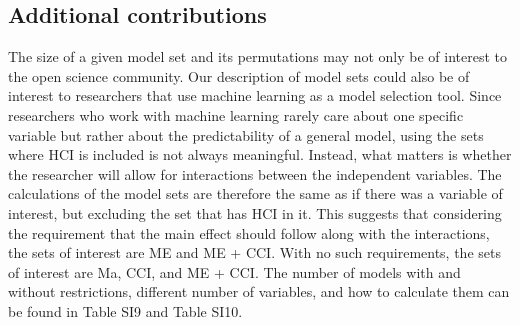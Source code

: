 \subsection{Additional contributions}
The size of a given model set and its permutations may not only be of interest to the open science community. Our description of model sets could also be of interest to researchers that use machine learning as a model selection tool. Since researchers who work with machine learning rarely care about one specific variable but rather about the predictability of a general model, using the sets where HCI is included is not always meaningful. Instead, what matters is whether the researcher will allow for interactions between the independent variables. The calculations of the model sets are therefore the same as if there was a variable of interest, but excluding the set that has HCI in it. This suggests that considering the requirement that the main effect should follow along with the interactions, the sets of interest are ME and ME + CCI. With no such requirements, the sets of interest are Ma, CCI, and ME + CCI. The number of models with and without restrictions, different number of variables, and how to calculate them can be found in Table SI9 and Table SI10. 


 
